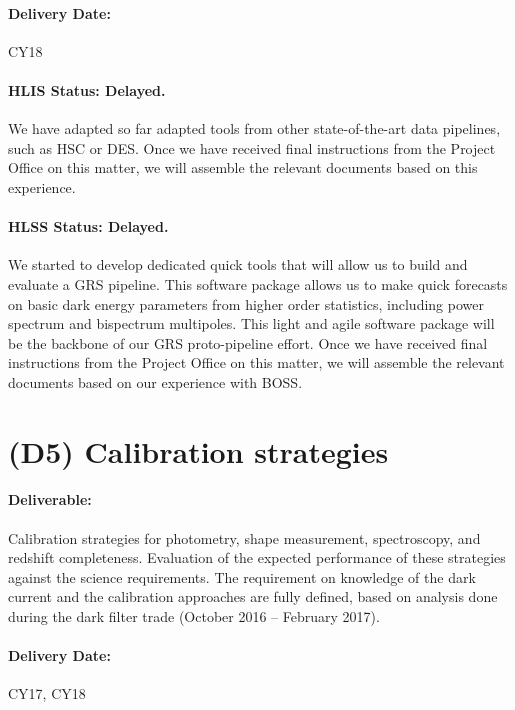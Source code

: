 \paragraph*{Delivery Date:} CY18

\paragraph*{HLIS Status: Delayed.} We have adapted so far adapted tools from other state-of-the-art data pipelines, such as HSC or DES. Once we have received final instructions from the Project Office on this matter, we will assemble the relevant documents based on this experience.

\paragraph*{HLSS Status: Delayed.} We started to develop dedicated quick tools that
will allow us to build and evaluate a GRS pipeline. This software package allows us to make quick forecasts on basic dark energy parameters from higher order statistics, including power spectrum and bispectrum multipoles. This light and agile software package will be the backbone of our GRS proto-pipeline effort. Once we have received final instructions from the Project Office on this matter, we will assemble the relevant documents based on our experience with BOSS.

\section*{(D5) Calibration strategies}

\paragraph*{Deliverable:} Calibration strategies for photometry, shape
measurement, spectroscopy, and redshift completeness. Evaluation of the expected
performance of these strategies against the science requirements. The
requirement on knowledge of the dark current and the calibration approaches are
fully defined, based on analysis done during the dark filter trade (October 2016
-- February 2017).

\paragraph*{Delivery Date:} CY17, CY18


